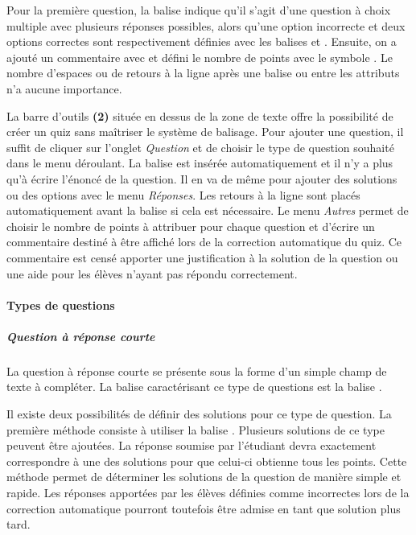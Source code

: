 \documentclass[a4,10pt,french]{sphinxmanual}
\begin{document}
Pour la première question, la balise \code{\{++\}} indique qu'il s'agit d'une question à choix multiple avec plusieurs réponses possibles, alors qu'une option incorrecte et deux options correctes sont respectivement définies avec les balises \code{\{*\}} et \code{\{=\}}. Ensuite, on a ajouté un commentaire avec \code{\{+\}} et défini le nombre de points avec le symbole . Le nombre d'espaces ou de retours à la ligne après une balise ou entre les attributs n'a aucune importance.

La barre d'outils \textbf{(2)} située en dessus de la zone de texte offre la possibilité de créer un quiz sans maîtriser le système de balisage. Pour ajouter une question, il suffit de cliquer sur l'onglet \emph{Question} et de choisir le type de question souhaité dans le menu déroulant. La balise est insérée automatiquement et il n'y a plus qu'à écrire l'énoncé de la question. Il en va de même pour ajouter des solutions ou des options avec le menu \emph{Réponses}. Les retours à la ligne sont placés automatiquement avant la balise si cela est nécessaire. Le menu \emph{Autres} permet de choisir le nombre de points à attribuer pour chaque question et d'écrire un commentaire destiné à être affiché lors de la correction automatique du quiz. Ce commentaire est censé apporter une justification à la solution de la question ou une aide pour les élèves n'ayant pas répondu correctement.


\paragraph{Types de questions}
\label{doc-user:types-de-questions}

\subparagraph{Question à réponse courte}
\label{doc-user:question-a-reponse-courte}
La question à réponse courte se présente sous la forme d'un simple champ de texte à compléter. La balise
caractérisant ce type de questions est la balise .

Il existe deux possibilités de définir des solutions pour ce type de question. La première méthode consiste
à utiliser la balise \code{\{=\}}. Plusieurs solutions de ce type peuvent être ajoutées. La réponse soumise par
l'étudiant devra exactement correspondre à une des solutions pour que celui-ci obtienne tous les points. Cette méthode permet de déterminer les solutions
de la question de manière simple et rapide. Les réponses apportées par les élèves définies comme incorrectes lors
de la correction automatique pourront toutefois être admise en tant que solution plus tard.
\end{document}
